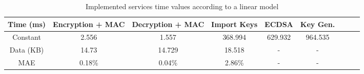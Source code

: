 \begin{table}[h!]
\centering
\def\arraystretch{1.5}
\begin{tabular}{|c|c|c|c|c|c|c|c|c|}
\hline
	Time (ms) & Encryption + MAC & Decryption + MAC & Import Keys & ECDSA & Key Gen. \\ \hline
	Constant  & 2.556  & 1.557   & 368.994 & 629.932 & 964.535 \\ \hline
	Data (KB) & 14.73  & 14.729  & 18.518  & - & - \\ \hline
	MAE	  & 0.18\% & 0.04\%  & 2.86\%  & - & - \\ \hline
\end{tabular}
\caption{Implemented services time values according to a linear model}
\label{tab:services-model}
\end{table}
